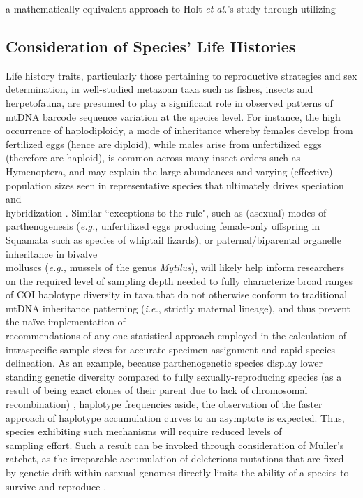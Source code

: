 a mathematically equivalent approach to Holt \textit{et al.}'s \cite{holt2007experimental} study through utilizing


\subsection{Consideration of Species' Life Histories}

Life history traits, particularly those pertaining to reproductive strategies and sex \\ determination, in well-studied metazoan taxa such as fishes, insects and herpetofauna, are presumed to play a significant role in observed patterns of mtDNA barcode sequence variation at the species level. For instance, the high occurrence of haplodiploidy, a mode of inheritance whereby females develop from fertilized eggs (hence are diploid), while males arise from unfertilized eggs (therefore are haploid), is common across many insect orders such as Hymenoptera, and may explain the large abundances and varying (effective) population sizes seen in representative species that ultimately drives speciation and \\ hybridization \cite{hebert2016counting}. Similar ``exceptions to the rule", such as (asexual) modes of \\ parthenogenesis (\textit{e.g.}, unfertilized eggs producing female-only offspring in Squamata such as species of whiptail lizards), or paternal/biparental organelle inheritance in bivalve \\ molluscs (\textit{e.g.}, mussels of the genus \textit{Mytilus}), will likely help inform researchers on the required level of sampling depth needed to fully characterize broad ranges of COI haplotype diversity in taxa that do not otherwise conform to traditional mtDNA inheritance patterning (\textit{i.e.}, strictly maternal lineage), and thus prevent the na\"ive implementation of \\ recommendations of any one statistical approach employed in the calculation of \\ intraspecific sample sizes for accurate specimen assignment and rapid species delineation. As an example, because parthenogenetic species display lower standing genetic diversity compared to fully sexually-reproducing species (as a result of being exact clones of their parent due to lack of chromosomal recombination) \cite{bengtsson2003genetic}, haplotype frequencies aside, the observation of the faster approach of haplotype accumulation curves to an asymptote is expected. Thus, species exhibiting such mechanisms will require reduced levels of \\ sampling effort. Such a result can be invoked through consideration of Muller's ratchet, as the irreparable accumulation of deleterious mutations that are fixed by genetic drift within asexual genomes directly limits the ability of a species to survive and reproduce \cite{felenstein1974evolutionary, muller1964relation}. 


